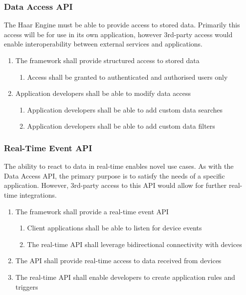       \subsubsection{Data Access API}
        The Haar Engine must be able to provide access to stored data. Primarily this access will be for use in its own application, however 3rd-party access would enable interoperability between external services and applications.

        \begin{enumerate}
          \item The framework shall provide structured access to stored data
          \begin{enumerate}
            \item Access shall be granted to authenticated and authorised users only
          \end{enumerate}
          \item Application developers shall be able to modify data access
          \begin{enumerate}
            \item Application developers shall be able to add custom data searches
            \item Application developers shall be able to add custom data filters
          \end{enumerate}
        \end{enumerate}

      \subsubsection{Real-Time Event API}
        The ability to react to data in real-time enables novel use cases. As with the Data Access API, the primary purpose is to satisfy the needs of a specific application. However, 3rd-party access to this API would allow for further real-time integrations.

        \begin{enumerate}
          \item The framework shall provide a real-time event API
          \begin{enumerate}
            \item Client applications shall be able to listen for device events
            \item The real-time API shall leverage bidirectional connectivity with devices
          \end{enumerate}
          \item The API shall provide real-time access to data received from devices
          \item The real-time API shall enable developers to create application rules and triggers
        \end{enumerate}

